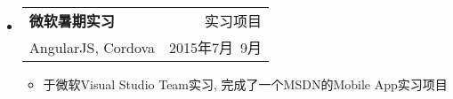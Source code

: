 \documentclass[letterpaper,10pt]{article}
\makeatletter
\newcommand{\resitem}[1]{\item #1 \vspace{-2pt}}
\newcommand{\resheading}[1]{{\large \colorbox{mygrey}{\begin{minipage}{\textwidth}{\textbf{#1 \vphantom{p\^{E}}}}\end{minipage}}}}
\newcommand{\ressubheading}[4]{
\begin{tabular*}{6.5in}{l@{\extracolsep{\fill}}r}
		\textbf{#1} & #2 \\
		#3 & #4 \\
\end{tabular*}\vspace{-6pt}}
\makeatother
\begin{document}
	\begin{itemize}
		\item 
			\ressubheading{微软暑期实习}{实习项目}{AngularJS, Cordova}{2015年7月~9月}
			{\begin{itemize}
				\resitem {于微软Visual Studio Team实习, 完成了一个MSDN的Mobile App实习项目}
			\end{itemize}}

	\end{itemize}
			




\end{document}
